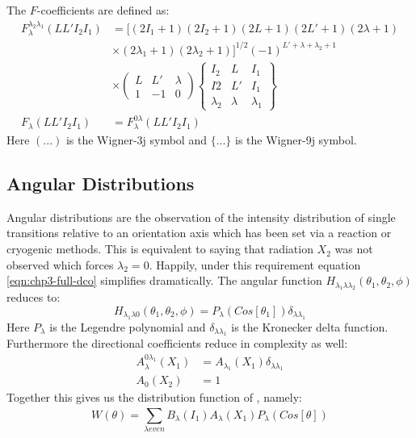 The $F$-coefficients are defined as:
\begin{align}
F_{\lambda{}}^{\lambda{}_2\lambda{}_1}(L L' I_2 I_1) &=[(2I_1+1)(2I_2+1)(2L+1)(2L'+1)(2\lambda{}+1)\nonumber \\ & \times{} (2\lambda{}_1+1)(2\lambda{}_2+1)]^{1/2} (-1)^{L'+\lambda{}+\lambda{}_2+1}\nonumber \\
& \times{} \left(\begin{array}{clcr}L & L' & \lambda{}\\ 1 & -1 & 0  \end{array}\right) \left\{\begin{array}{clcr}I_2 & L & I_1\\ I2 & L' & I_1\\ \lambda{}_2 & \lambda{} & \lambda{}_1 \end{array}\right\} \label{eqn:chp3-gen-fcoef}\\
F_{\lambda{}}(L L' I_2 I_1) &= F_{\lambda{}}^{0\lambda{}}(L L' I_2 I_1)\label{eqn:chp3-fcoef}
\end{align}
Here $(...)$ is the Wigner-3j symbol and $\{ ... \}$ is the Wigner-9j symbol.

\subsection{Angular Distributions}
\label{ssec:exp-pr-data-ang-dist}
Angular distributions are the observation of the intensity distribution of single transitions relative to an orientation axis which has been set via a reaction or cryogenic methods. This is equivalent to saying that radiation $X_2$ was not observed which forces $\lambda{}_2=0$. Happily, under this requirement equation \ref{eqn:chp3-full-dco} simplifies dramatically. The angular function $H_{\lambda{}_1\lambda{}\lambda{}_2}\left(\theta{}_1,\theta{}_2,\phi{}\right)$ reduces to:
\begin{equation}
\label{eqn:chp3-simple-ang-func}
H_{\lambda{}_1\lambda{}0}\left(\theta{}_1,\theta{}_2,\phi{}\right) = P_{\lambda{}}(Cos[\theta{}_1])\delta_{\lambda{}\lambda{}_1}
\end{equation}
Here $P_{\lambda{}}$ is the Legendre polynomial and $\delta_{\lambda{}\lambda{}_1}$ is the Kronecker delta function. Furthermore the directional coefficients reduce in complexity as well:
\begin{align}
A_{\lambda{}}^{0\lambda{}_1}\left(X_1\right) &= A_{\lambda{}_1}\left(X_1\right)\delta_{\lambda{}\lambda{}_1} \label{eqn:chp3-gen-ddc-red}\\
A_{0}\left(X_2\right) &= 1 \label{eqn:chp3-ddc-red}
\end{align}
Together this gives us the distribution function of \cite{angDist}, namely:
\begin{equation}
\label{eqn:chp3-ang-dist}
W(\theta{}) = \sum\limits_{\lambda even}^{} B_{\lambda{}}\left(I_1\right) A_{\lambda{}}\left(X_1\right) P_{\lambda{}}(Cos[\theta{}])
\end{equation}

